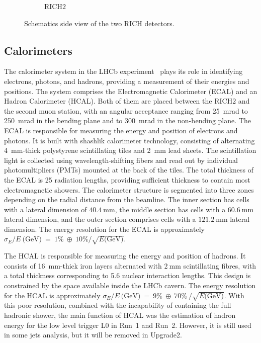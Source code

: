 \begin{figure}
\begin{subfigure}{0.48\textwidth}
    \caption{RICH$2$}\label{rich2}
    \end{subfigure}
    \caption{Schematics side view of the two RICH detectors.}
    \label{fig:rich}
\end{figure}

\subsection{Calorimeters}
\sloppy
The calorimeter system in the LHCb experiment~\cite{LHCb:2000vji} plays its role in identifying electrons, photons, and hadrons, providing a measurement of their energies and positions. The system comprises the Electromagnetic Calorimeter (ECAL) and an  Hadron Calorimeter (HCAL). Both of them are  placed between the RICH$2$ and the second muon station, with an angular acceptance ranging from \SI{25}{\milli\radian} to \SI{250}{\milli\radian} in the bending plane and to \SI{300}{\milli\radian} in the non-bending plane. 
The ECAL is responsible for measuring the energy and position of electrons and photons. It is built with shashlik calorimeter technology\cite{Badier:293003}, consisting of alternating \SI{4}{\milli\meter}-thick polystyrene scintillating tiles and \SI{2}{\milli\meter} lead sheets. The scintillation light is collected using wavelength-shifting fibers and read out by individual photomultipliers (PMTs) mounted at the back of the tiles. The total thickness of the ECAL is 25 radiation lengths, providing sufficient thickness to contain most electromagnetic showers. The calorimeter structure is segmented into three zones depending on the radial distance from the beamline. The inner section has cells with a lateral dimension of $\SI{40.4}{\milli\meter}$, the middle section has cells with a $\SI{60.6}{\milli\meter}$ lateral dimension, and the outer section comprises cells with a $\SI{121.2}{\milli\meter}$ lateral dimension. The energy resolution for the ECAL is approximately 
 $\sigma_E/E~\text{(GeV)}~=~1\%~\oplus~10\%/\sqrt{E\text{(GeV)}}$.

\sloppy
The HCAL is responsible for measuring the energy and position of hadrons. It consists of \SI{16}{\milli\meter}-thick iron layers alternated with $\SI{2}{\milli\meter}$ scintillating fibres, with a total thickness corresponding to 5.6 nuclear interaction lengths. This design is constrained by the space available inside the LHCb cavern. The energy resolution for the HCAL is approximately $\sigma_E/E~\text{(GeV)}~=~9\%~\oplus~70\%~/\sqrt{E\text{(GeV)}}$. With this poor resolution, combined with the incapability of containing the full hadronic shower, the main function of HCAL was the estimation of hadron energy for the low level trigger L$0$ in Run~1 and Run~2. However, it is still used in some jets analysis, but it will be removed in Upgrade2.

